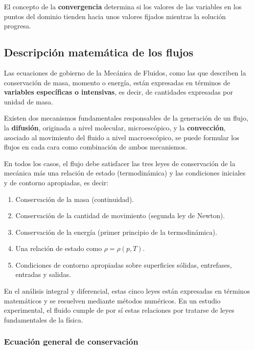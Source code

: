 El concepto de la \textbf{convergencia} determina si los valores de las
variables en los puntos del dominio tienden hacia unos valores fijados
mientras la solución progresa.

\subsection{Descripción matemática de los flujos}\label{header-n256}

Las ecuaciones de gobierno de la Mecánica de Fluidos, como las que
describen la conservación de masa, momento o energía, están expresadas
en términos de \textbf{variables específicas o intensivas}, es decir, de
cantidades expresadas por unidad de masa.

Existen dos mecanismos fundamentales responsables de la generación de un
flujo, la \textbf{difusión}, originada a nivel molecular, microescópico,
y la \textbf{convección}, asociado al movimiento del fluido a nivel
macroescópico, se puede formular los flujos en cada cara como
combinación de ambos mecanismos.

En todos los casos, el flujo debe satisfacer las tres leyes de
conservación de la mecánica más una relación de estado (termodinámica) y
las condiciones iniciales y de contorno apropiadas, es decir:

\begin{enumerate}
\def\labelenumi{\arabic{enumi}.}
\item
  Conservación de la masa (continuidad).
\item
  Conservación de la cantidad de movimiento (segunda ley de Newton).
\item
  Conservación de la energía (primer principio de la termodinámica).
\item
  Una relación de estado como \(\rho=\rho(p,T)\).
\item
  Condiciones de contorno apropiadas sobre superficies sólidas,
  entrefases, entradas y salidas.
\end{enumerate}

En el análisis integral y diferencial, estas cinco leyes están
expresadas en términos matemáticos y se resuelven mediante métodos
numéricos. En un estudio experimental, el fluido cumple de por sí estas
relaciones por tratarse de leyes fundamentales de la física.

\subsubsection{Ecuación general de
conservación}\label{header-n283}

